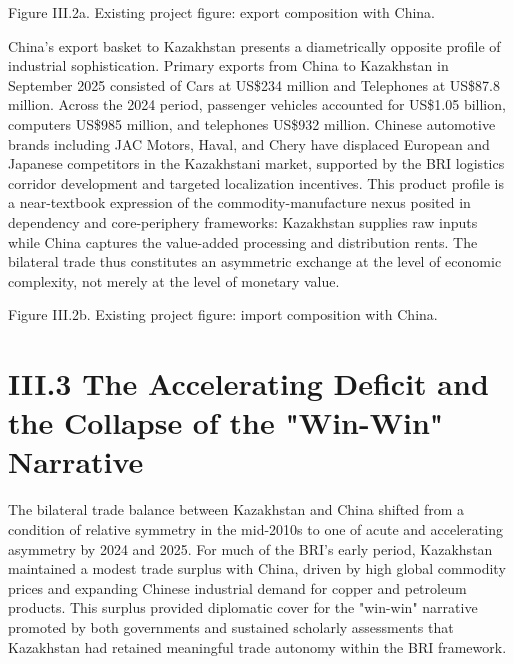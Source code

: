 \documentclass[12pt]{article}
\begin{document}
Figure III.2a. Existing project figure: export composition with China.\par
China's export basket to Kazakhstan presents a diametrically opposite profile of industrial sophistication. Primary exports from China to Kazakhstan in September 2025 consisted of Cars at US\$234 million and Telephones at US\$87.8 million. Across the 2024 period, passenger vehicles accounted for US\$1.05 billion, computers US\$985 million, and telephones US\$932 million. Chinese automotive brands including JAC Motors, Haval, and Chery have displaced European and Japanese competitors in the Kazakhstani market, supported by the BRI logistics corridor development and targeted localization incentives. This product profile is a near-textbook expression of the commodity-manufacture nexus posited in dependency and core-periphery frameworks: Kazakhstan supplies raw inputs while China captures the value-added processing and distribution rents. The bilateral trade thus constitutes an asymmetric exchange at the level of economic complexity, not merely at the level of monetary value.\par

Figure III.2b. Existing project figure: import composition with China.\par

\section{III.3 The Accelerating Deficit and the Collapse of the "Win-Win" Narrative}

The bilateral trade balance between Kazakhstan and China shifted from a condition of relative symmetry in the mid-2010s to one of acute and accelerating asymmetry by 2024 and 2025. For much of the BRI's early period, Kazakhstan maintained a modest trade surplus with China, driven by high global commodity prices and expanding Chinese industrial demand for copper and petroleum products. This surplus provided diplomatic cover for the "win-win" narrative promoted by both governments and sustained scholarly assessments that Kazakhstan had retained meaningful trade autonomy within the BRI framework.\par
\end{document}
